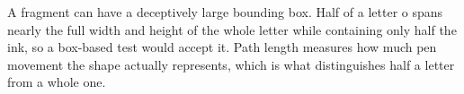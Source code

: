 A fragment can have a deceptively large bounding box. Half of a letter o spans nearly the full width and height of the whole letter while containing only half the ink, so a box-based test would accept it. Path length measures how much pen movement the shape actually represents, which is what distinguishes half a letter from a whole one.


